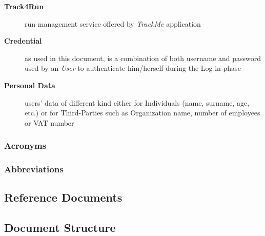 \documentclass[a4paper]{article}
\begin{document}
\begin{description}
                    \item[\textbf{Track4Run}] run management service offered by \textit{TrackMe} application
                    
                    \item[\textbf{Credential}] as used in this document, is a combination of both username and password used by an \textit{User} to authenticate him/herself during the Log-in phase
                    
                    \item[\textbf{Personal Data}] users' data of different kind either for Individuals (name, surname, age, etc.) or for Third-Parties such as Organization name, number of employees or VAT number
                \end{description}
                
            
            \subsubsection{Acronyms}
            \begin{acronym}
            \end{acronym}
            
            \subsubsection{Abbreviations}
            
\subsection{Reference Documents}

\printbibliography[heading=none]


\newpage

\subsection{Document Structure}
\end{document}
